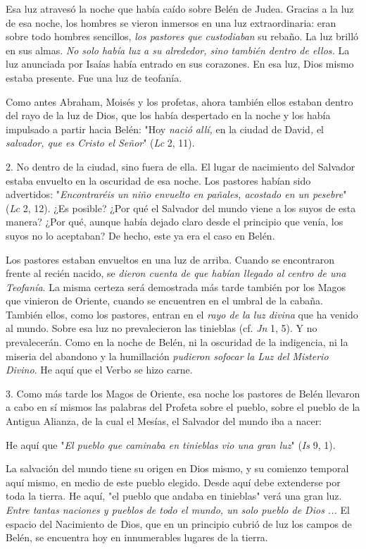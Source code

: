 Esa luz atravesó la noche que había caído sobre Belén de Judea. Gracias
a la luz de esa noche, los hombres se vieron inmersos en una luz
extraordinaria: eran sobre todo hombres sencillos, \emph{los pastores
	que custodiaban} su rebaño. La luz brilló en sus almas. \emph{No solo
	había luz a su alrededor, sino también dentro de ellos.} La luz
anunciada por Isaías había entrado en sus corazones. En esa luz, Dios
mismo estaba presente. Fue una luz de teofanía.

Como antes Abraham, Moisés y los profetas, ahora también ellos estaban
dentro del rayo de la luz de Dios, que los había despertado en la noche
y los había impulsado a partir hacia Belén: "Hoy \emph{nació allí,} en
la ciudad de David\emph{,} el \emph{salvador, que es Cristo el Señor}"
(\emph{Lc} 2, 11).

2. No dentro de la ciudad, sino fuera de ella. El lugar de nacimiento
del Salvador estaba envuelto en la oscuridad de esa noche. Los pastores
habían sido advertidos: "\emph{Encontraréis un niño envuelto en pañales,
	acostado en un pesebre}" (\emph{Lc} 2, 12). ¿Es posible? ¿Por qué el
Salvador del mundo viene a los suyos de esta manera? ¿Por qué, aunque
había dejado claro desde el principio que venía, los suyos no lo
aceptaban? De hecho, este ya era el caso en Belén.

Los pastores estaban envueltos en una luz de arriba. Cuando se
encontraron frente al recién nacido, se \emph{dieron cuenta de que
	habían llegado al centro de una Teofanía}. La misma certeza será
demostrada más tarde también por los Magos que vinieron de Oriente,
cuando se encuentren en el umbral de la cabaña. También ellos, como los
pastores, entran en el \emph{rayo de la luz divina} que ha venido al
mundo. Sobre esa luz no prevalecieron las tinieblas (cf. \emph{Jn} 1,
5). Y no prevalecerán. Como en la noche de Belén, ni la oscuridad de la
indigencia, ni la miseria del abandono y la humillación \emph{pudieron
	sofocar la Luz del Misterio Divino}. He aquí que el Verbo se hizo carne.

3. Como más tarde los Magos de Oriente, esa noche los pastores de Belén
llevaron a cabo en sí mismos las palabras del Profeta sobre el pueblo,
sobre el pueblo de la Antigua Alianza, de la cual el Mesías, el Salvador
del mundo iba a nacer:

He aquí que "\emph{El pueblo que caminaba en tinieblas vio una gran
	luz}" (\emph{Is} 9, 1).

La salvación del mundo tiene su origen en Dios mismo, y su comienzo
temporal aquí mismo, en medio de este pueblo elegido. Desde aquí debe
extenderse por toda la tierra. He aquí, "el pueblo que andaba en
tinieblas" verá una gran luz. \emph{Entre tantas naciones y pueblos de
	todo el mundo, un solo pueblo de Dios ...} El espacio del Nacimiento de
Dios, que en un principio cubrió de luz los campos de Belén, se
encuentra hoy en innumerables lugares de la tierra.

